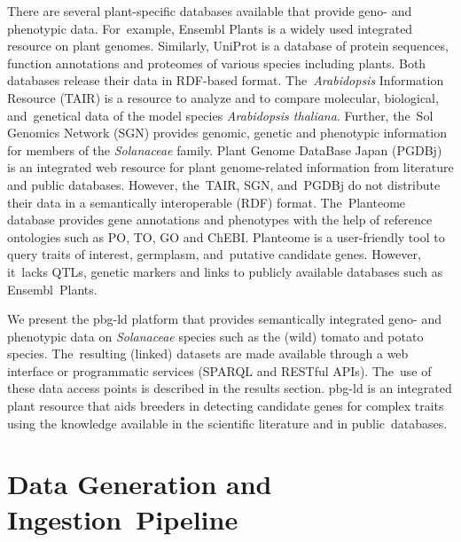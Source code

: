 \documentclass[applsci,article,accept,moreauthors,pdftex]{Definitions/mdpi}
\begin{document}
There are several plant-specific databases available that provide geno- and phenotypic data. %
For~example, Ensembl Plants is a widely used integrated resource on plant genomes. Similarly, UniProt is a database of protein sequences, function annotations and proteomes of various species including plants. Both databases release their data in RDF-based format. The~\textit{Arabidopsis} %
Information Resource (TAIR) \cite{garcia2002tair} is a resource to analyze and to compare molecular, biological, and~genetical data of the model species \textit{Arabidopsis thaliana}. %
Further, the~Sol Genomics Network (SGN) \cite{mueller2005sol} provides genomic, genetic and phenotypic information for members of the \textit{Solanaceae} %
family. Plant Genome DataBase Japan (PGDBj) \cite{nakaya2017plant} is an integrated web resource for plant genome-related information from literature and public databases. However, the~TAIR, SGN, and~PGDBj do not distribute their data in a semantically interoperable (RDF) format. The~Planteome~\cite{Cooper2018} database provides gene annotations and phenotypes with the help of reference ontologies such as PO, TO, GO and ChEBI. Planteome is a user-friendly tool to query traits of interest, germplasm, and~putative candidate genes. However, it~lacks QTLs, genetic markers and links to publicly available databases such as Ensembl~Plants.

We present the pbg-ld platform that provides semantically integrated geno- and phenotypic data %
on \textit{Solanaceae} %
species such as the (wild) tomato and potato species. %
The~resulting (linked) datasets are made available through a web interface or programmatic services (SPARQL and RESTful APIs). The~use of these data access points is described in the results section. pbg-ld %
is an integrated plant resource that aids breeders in detecting candidate genes for complex traits using the knowledge available in the scientific literature and in public~databases.


\section{Data Generation and Ingestion~Pipeline}
\end{document}
